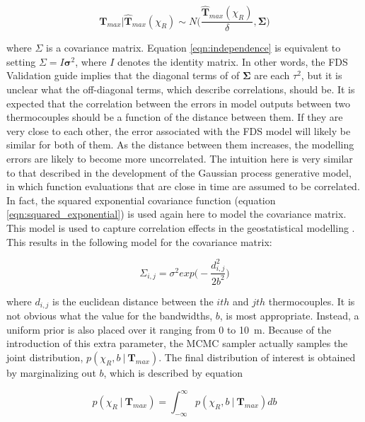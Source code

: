 \documentclass{article}
\begin{document}
\begin{equation}
  \label{eqn:mv_likelihood}
    \boldsymbol{T}_{max} \bigg| \boldsymbol{\hat{T}}_{max}(\chi_R) \sim N\Bigg( \frac{\hat{\boldsymbol{T}}_{max}(\chi_R)}{\delta}, \boldsymbol\Sigma \Bigg)
\end{equation}

\noindent where $\Sigma$ is a covariance matrix. Equation \ref{eqn:independence} is equivalent to setting $\Sigma = I\boldsymbol{\sigma}^2$, where $I$ denotes the identity matrix. In other words, the FDS Validation guide implies that the diagonal terms of of $\boldsymbol\Sigma$ are each $\tau^2$, but it is unclear what the off-diagonal terms, which describe correlations, should be. It is expected that the correlation between the errors in model outputs between two thermocouples should be a function of the distance between them. If they are very close to each other, the error associated with the FDS model will likely be similar for both of them. As the distance between them increases, the modelling errors are likely to become more uncorrelated. The intuition here is very similar to that described in the development of the Gaussian process generative model, in which function evaluations that are close in time are assumed to be correlated. In fact, the squared exponential covariance function (equation \ref{eqn:squared_exponential}) is used again here to model the covariance matrix. This model is used to capture correlation effects in the geostatistical modelling \cite{f2007methods}. This results in the following model for the covariance matrix:

 \begin{equation}
  \label{eqn:squared_exponential_spatial}
    \Sigma_{i,j}= \sigma^2exp\bigg(-\frac{d_{i,j}^2}{2b^2}\bigg)
\end{equation}

\noindent where $d_{i,j}$ is the euclidean distance between the $ith$ and $jth$ thermocouples. It is not obvious what the value for the bandwidths, $b$, is most appropriate. Instead, a uniform prior is also placed over it ranging from 0 to 10~m. Because of the introduction of this extra parameter, the MCMC sampler actually samples the joint distribution, $p(\chi_R, b \ | \ \boldsymbol{T}_{max})$. The final distribution of interest is obtained by marginalizing out $b$, which is described by equation 

 \begin{equation}
  \label{eqn:squared_exponential_spatial}
   p(\chi_R \ | \ \boldsymbol{T}_{max}) = \int_{-\infty}^{\infty} p(\chi_R, b \ | \ \boldsymbol{T}_{max}) db
\end{equation}
\end{document}
